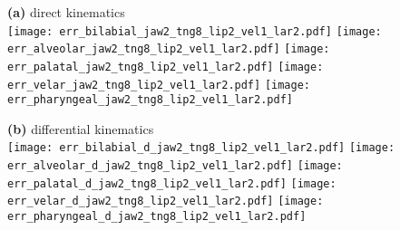 \documentclass[varwidth=7.5in]{standalone}
\begin{document}
\raggedright

{\bf (a)} direct kinematics\\
\texttt{[image: err\_bilabial\_jaw2\_tng8\_lip2\_vel1\_lar2.pdf]}%
\texttt{[image: err\_alveolar\_jaw2\_tng8\_lip2\_vel1\_lar2.pdf]}%
\texttt{[image: err\_palatal\_jaw2\_tng8\_lip2\_vel1\_lar2.pdf]}%
\texttt{[image: err\_velar\_jaw2\_tng8\_lip2\_vel1\_lar2.pdf]}%
\texttt{[image: err\_pharyngeal\_jaw2\_tng8\_lip2\_vel1\_lar2.pdf]}

{\bf (b)} differential kinematics\\
\texttt{[image: err\_bilabial\_d\_jaw2\_tng8\_lip2\_vel1\_lar2.pdf]}%
\texttt{[image: err\_alveolar\_d\_jaw2\_tng8\_lip2\_vel1\_lar2.pdf]}%
\texttt{[image: err\_palatal\_d\_jaw2\_tng8\_lip2\_vel1\_lar2.pdf]}%
\texttt{[image: err\_velar\_d\_jaw2\_tng8\_lip2\_vel1\_lar2.pdf]}%
\texttt{[image: err\_pharyngeal\_d\_jaw2\_tng8\_lip2\_vel1\_lar2.pdf]}
\end{document}
